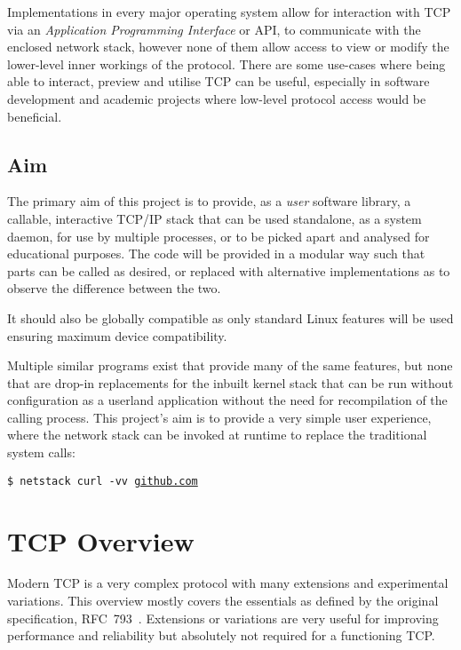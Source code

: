 \documentclass[11pt,a4paper,british]{bhamarticle}
\begin{document}
\begin{multicols}{2}
Implementations in every major operating system allow for interaction with TCP via an \textit{Application Programming Interface} or API, to communicate with the enclosed network stack, however none of them allow access to view or modify the lower-level inner workings of the protocol. There are some use-cases where being able to interact, preview and utilise TCP can be useful, especially in software development and academic projects where low-level protocol access would be beneficial.

\subsection{Aim}
The primary aim of this project is to provide, as a \textit{user} software library, a callable, interactive TCP/IP stack that can be used standalone, as a system daemon, for use by multiple processes, or to be picked apart and analysed for educational purposes. The code will be provided in a modular way such that parts can be called as desired, or replaced with alternative implementations as to observe the difference between the two.

It should also be globally compatible as only standard Linux features will be used ensuring maximum device compatibility.

Multiple similar programs exist that provide many of the same features, but none that are drop-in replacements for the inbuilt kernel stack that can be run without configuration as a userland application without the need for recompilation of the calling process. This project's aim is to provide a very simple user experience, where the network stack can be invoked at runtime to replace the traditional system calls:

\begin{center}
    \texttt{\$ netstack curl -vv \url{github.com}}
\end{center}

\section{TCP Overview}
Modern TCP is a very complex protocol with many extensions and experimental variations. This overview mostly covers the essentials as defined by the original specification, RFC~793~\cite{rfc793}. Extensions or variations are very useful for improving performance and reliability but absolutely not required for a functioning TCP. %


\end{multicols}
\end{document}
